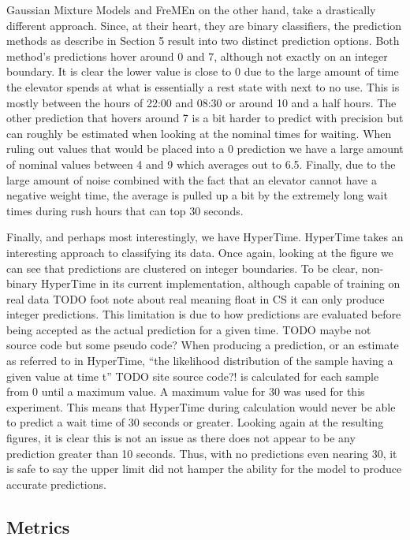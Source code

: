 Gaussian Mixture Models and FreMEn on the other hand, take a drastically
different approach.  Since, at their heart, they are binary classifiers, the
prediction methods as describe in Section 5 result into two distinct
prediction options. Both method's predictions hover around 0 and 7, although
not exactly on an integer boundary. It is clear the lower value is close to 0
due to the large amount of time the elevator spends at what is essentially a
rest state with next to no use. This is mostly between the hours of 22:00 and
08:30 or around 10 and a half hours. The other prediction that hovers around 7
is a bit harder to predict with precision but can roughly be estimated when
looking at the nominal times for waiting. When ruling out values that would be
placed into a 0 prediction we have a large amount of nominal values between 4
and 9 which averages out to 6.5. Finally, due to the large amount of noise
combined with the fact that an elevator cannot have a negative weight time,
the average is pulled up a bit by the extremely long wait times during rush
hours that can top 30 seconds.

Finally, and perhaps most interestingly, we have HyperTime. HyperTime takes an
interesting approach to classifying its data. Once again, looking at the figure
we can see that predictions are clustered on integer boundaries. To be clear,
non-binary HyperTime in its current implementation, although capable of training
on real data TODO foot note about real meaning float in CS it can only produce
integer predictions. This limitation is due to how predictions are evaluated
before being accepted as the actual prediction for a given time. TODO maybe
not source code but some pseudo code? When producing a prediction, or an
estimate as referred to in HyperTime, ``the likelihood distribution of the
sample having a given value at time t'' TODO site source code?! is calculated
for each sample from 0 until a maximum value. A maximum value for 30 was used
for this experiment. This means that HyperTime during calculation would never
be able to predict a wait time of 30 seconds or greater. Looking again at the
resulting figures, it is clear this is not an issue as there does not appear to
be any prediction greater than 10 seconds. Thus, with no predictions even
nearing 30, it is safe to say the upper limit did not hamper the ability for
the model to produce accurate predictions.

\subsection{ Metrics }

